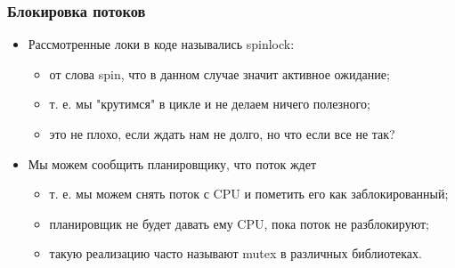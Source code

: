 \begin{frame}
\frametitle{Блокировка потоков}
\begin{itemize}
  \item Рассмотренные локи в коде назывались spinlock:
  \begin{itemize}
    \item от слова spin, что в данном случае значит активное ожидание;
    \item т. е. мы "крутимся" в цикле и не делаем ничего полезного;
    \item это не плохо, если ждать нам не долго, но что если все не так?
  \end{itemize}
  \item Мы можем сообщить планировщику, что поток ждет
  \begin{itemize}
    \item т. е. мы можем снять поток с CPU и пометить его как заблокированный;
    \item планировщик не будет давать ему CPU, пока поток не разблокируют;
    \item такую реализацию часто называют mutex в различных библиотеках.
  \end{itemize}
\end{itemize}
\end{frame}
